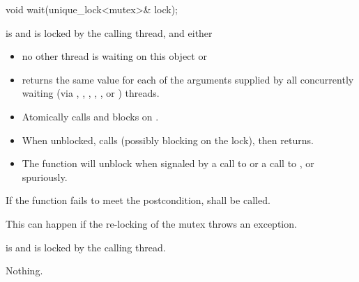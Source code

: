 %
\begin{itemdecl}
void wait(unique_lock<mutex>& lock);
\end{itemdecl}
\begin{itemdescr}
 \pnum \requires {} is  and 
        is locked by the calling thread, and either
        \begin{itemize}
         \item no other thread is waiting on this  object or
         \item {} returns the same value for each of the 
                arguments supplied by all concurrently waiting (via ,
                , ,
                {\color{insertcolor} , , or }) threads.
        \end{itemize}

 \pnum\effects
 \begin{itemize}
        \item Atomically calls  and blocks on .
        \item When unblocked, calls  (possibly blocking on the lock), then returns.
        \item The function will unblock when signaled by a call to 
              or a call to , or spuriously.
 \end{itemize}

 \pnum \remarks
        If the function fails to meet the postcondition, 
        shall be called.
        \begin{note} This can happen if the re-locking of the mutex throws an exception. \end{note}
 
 \pnum \postconditions {} is  and 
        is locked by the calling thread.

 \pnum\throws Nothing.
\end{itemdescr}


